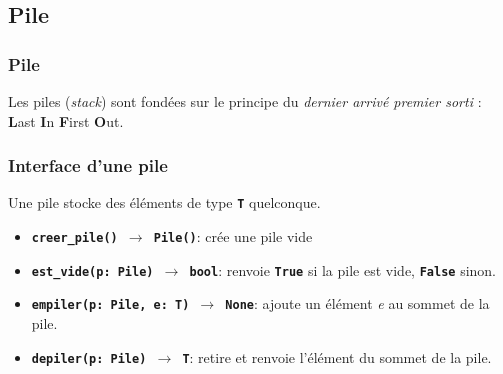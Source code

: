 \documentclass[svgnames,11pt]{beamer}
\begin{document}
\subsection{Pile}
\begin{frame}
    \frametitle{Pile}
    \begin{aretenir}[]
        Les piles (\emph{stack}) sont fondées sur le principe du \emph{dernier arrivé premier sorti} : \textbf{L}ast \textbf{I}n \textbf{F}irst \textbf{O}ut.
    \end{aretenir}


\end{frame}
\begin{frame}
    \frametitle{}

    \begin{center}
    \end{center}
\end{frame}
\begin{frame}
    \frametitle{Interface d'une pile}
    Une pile stocke des éléments de type \textbf{\texttt{T}} quelconque.
    \begin{itemize}
        \item \texttt{\textbf{creer\_pile() $\rightarrow$ Pile()}}: crée une pile vide
        \item \texttt{\textbf{est\_vide(p: Pile) $\rightarrow$ bool}}: renvoie \textbf{\texttt{True}} si la pile est vide, \textbf{\texttt{False}} sinon.
        \item \texttt{\textbf{empiler(p: Pile, e: T) $\rightarrow$ None}}: ajoute un élément \emph{e} au sommet de la pile.
        \item \texttt{\textbf{depiler(p: Pile) $\rightarrow$ T}}: retire et renvoie l'élément du sommet de la pile.
    \end{itemize}

\end{frame}
\end{document}
